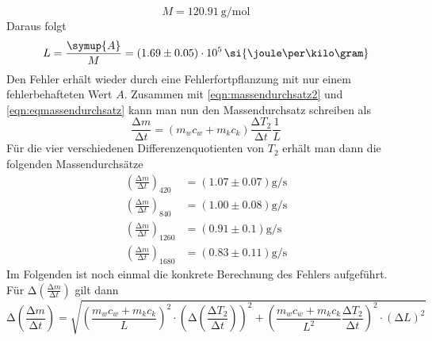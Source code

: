 \begin{equation}
M = \SI{120.91}{\gram\per\mol}
\end{equation}
Daraus folgt
\begin{equation}
L = \frac{\symup{A}}{M} = (1.69 \pm 0.05) \cdot 10^{5} \, \si{\joule\per\kilo\gram}
\end{equation}
Den Fehler erhält wieder durch eine Fehlerfortpflanzung mit nur einem fehlerbehafteten Wert $A$.
Zusammen mit \eqref{eqn:massendurchsatz2} und \eqref{eqn:eqmassendurchsatz} kann man nun den Massendurchsatz schreiben als
\begin{equation}
\frac{\increment m}{\increment t} = (m_{w}c_{w} + m_{k}c_{k})\frac{\increment T_{2}}{\increment t} \frac{1}{L}
\end{equation}
Für die vier verschiedenen Differenzenquotienten von $T_{2}$ erhält man dann die folgenden Massendurchsätze
\begin{align}
\left( \frac{\increment m}{\increment t} \right)_{420} &= (1.07 \pm 0.07) \si{\gram\per\second} \\
\left( \frac{\increment m}{\increment t} \right)_{840} &= (1.00 \pm 0.08) \si{\gram\per\second} \\
\left( \frac{\increment m}{\increment t} \right)_{1260}&= (0.91 \pm 0.1) \si{\gram\per\second} \\
\left( \frac{\increment m}{\increment t} \right)_{1680}&= (0.83 \pm 0.11) \si{\gram\per\second} 
\end{align}
Im Folgenden ist noch einmal die konkrete Berechnung des Fehlers aufgeführt.
Für $\increment \left( \frac{\increment m}{\increment t} \right) $ gilt dann
\begin{equation}
\increment \left(\frac{\increment m}{\increment t}\right) = \sqrt{\left( \frac{m_{w}c_{w} + m_{k}c_{k}}{L} \right)^{2} \cdot \left( \increment \left( \frac{\increment T_{2}}{\increment t}\right) \right)^2 +
\left( \frac{m_{w}c_{w} + m_{k}c_{k}}{L^{2}} \frac{\increment T_{2}}{\increment t}\right)^{2} \cdot (\increment L)^2}
\end{equation}
